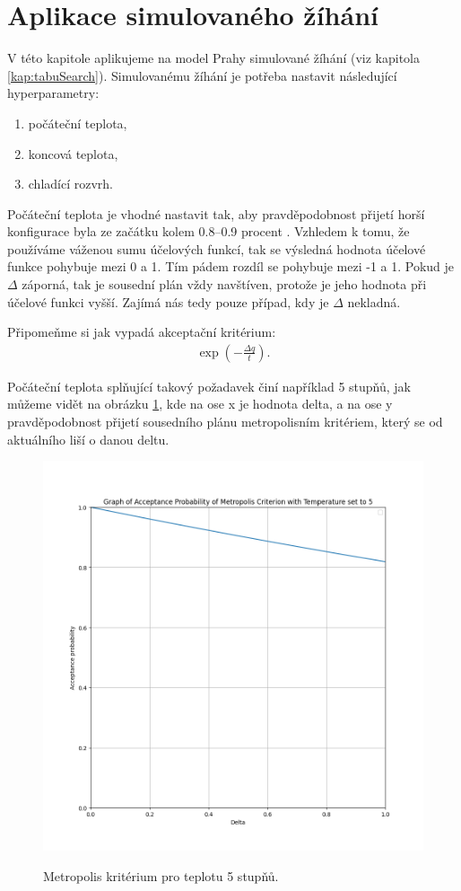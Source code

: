 \section{Aplikace simulovaného žíhání}

V této kapitole aplikujeme na model Prahy simulované žíhání (viz kapitola \ref{kap:tabuSearch}).
Simulovanému žíhání je potřeba nastavit následující hyperparametry:
\begin{enumerate}
  \item počáteční teplota,
  \item koncová teplota,
  \item chladící rozvrh.
\end{enumerate}

Počáteční teplota je vhodné nastavit tak, aby pravděpodobnost přijetí horší konfigurace byla ze začátku kolem 0.8--0.9 procent \cite{sa_theory}.
Vzhledem k tomu, že používáme váženou sumu účelových funkcí, tak se výsledná hodnota účelové funkce pohybuje mezi 0 a 1.
Tím pádem rozdíl se pohybuje mezi -1 a 1.
Pokud je $\Delta$ záporná, tak je sousední plán vždy navštíven, protože je
jeho hodnota při účelové funkci vyšší. Zajímá nás tedy pouze případ, kdy je $\Delta$ nekladná.

Připomeňme si jak vypadá akceptační kritérium:
\begin{align*}\label{df:metropolis}
  \exp\left(-\frac{\Delta q}{t}\right).
\end{align*}

Počáteční teplota splňující takový požadavek činí například 5 stupňů, jak můžeme vidět na obrázku \ref{img:metropolis_5},
kde na ose x je hodnota delta, a na ose y pravděpodobnost přijetí sousedního plánu metropolisním kritériem, který se od aktuálního liší o danou deltu.

\begin{figure}[H]
  \caption{Metropolis kritérium pro teplotu 5 stupňů.}
  \includegraphics[width=\textwidth]{img/metropolis_5.png}
  \centering
  \label{img:metropolis_5}
\end{figure}

